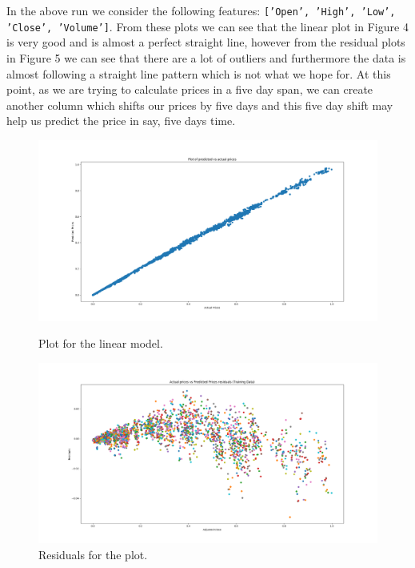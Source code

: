 \documentclass[11pt]{report}
\begin{document}
\clearpage
\noindent
In the above run we consider the following features: \texttt{['Open', 'High', 'Low', 'Close', 'Volume']}. From these plots we can see that the linear plot in Figure 4 is very good and is almost a perfect straight line, however from the residual plots in Figure 5 we can see that there are a lot of outliers and furthermore the data is almost following a straight line pattern which is not what we hope for. At this point, as we are trying to calculate prices in a five day span, we can create another column which shifts our prices by five days and this five day shift may help us predict the price in say, five days time.

\begin{figure}[ht]
\begin{minipage}[b]{.5\textwidth}
\centering
\includegraphics[width=1\textwidth]{plot2.png}
\caption{Plot for the linear model.}
\end{minipage}
\hfill
\begin{minipage}[b]{.5\textwidth}
\centering
\includegraphics[width=1\textwidth]{resid2.png}
\caption{Residuals for the plot.}
\end{minipage}
\end{figure}
\end{document}
